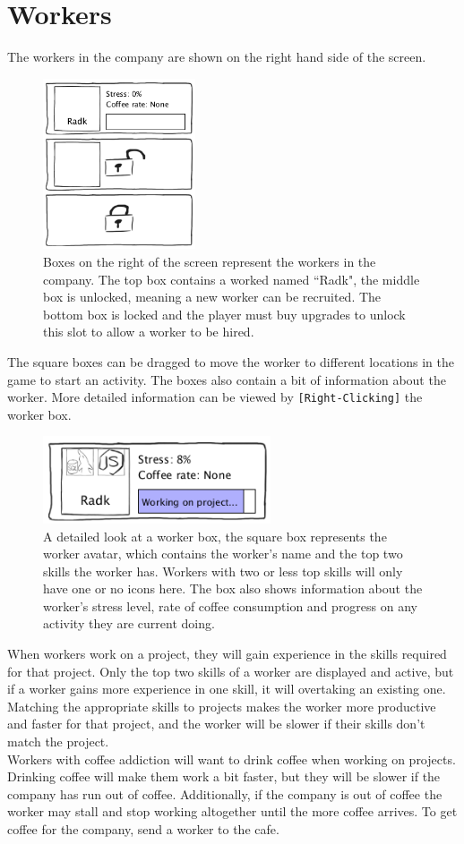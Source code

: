 \documentclass[11pt]{article}
\newcommand{\n}[0]{\\[\baselineskip]}
\begin{document}
\section{Workers}
The workers in the company are shown on the right hand side of the screen. 
\begin{figure}[H]
\centering
\includegraphics[width=0.4\textwidth, keepaspectratio]{imgs/all-workers.png}
\caption{Boxes on the right of the screen represent the workers in the company. The top box contains a worked named ``Radk", the middle box is unlocked, meaning a new worker can be recruited. The bottom box is locked and the player must buy upgrades to unlock this slot to allow a worker to be hired.}
\end{figure}
\noindent
The square boxes can be dragged to move the worker to different locations in the game to start an activity. The boxes also contain a bit of information about the worker. More detailed information can be viewed by \texttt{[Right-Clicking]} the worker box. 
\begin{figure}[H]
\centering
\includegraphics[width=0.6\textwidth, keepaspectratio]{imgs/worker.png}
\caption{A detailed look at a worker box, the square box represents the worker avatar, which contains the worker's name and the top two skills the worker has. Workers with two or less top skills will only have one or no icons here. The box also shows information about the worker's stress level, rate of coffee consumption and progress on any activity they are current doing.}
\end{figure}
\noindent
When workers work on a project, they will gain experience in the skills required for that project. Only the top two skills of a worker are displayed and active, but if a worker gains more experience in one skill, it will overtaking an existing one. Matching the appropriate skills to projects makes the worker more productive and faster for that project, and the worker will be slower if their skills don't match the project. 
\n
Workers with coffee addiction will want to drink coffee when working on projects. Drinking coffee will make them work a bit faster, but they will be slower if the company has run out of coffee. Additionally, if the company is out of coffee the worker may stall and stop working altogether until the more coffee arrives. To get coffee for the company, send a worker to the cafe.
\end{document}

